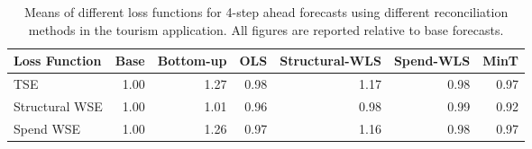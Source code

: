 \begin{table}[ht]
\centering
\begin{tabular}{lrrrrrr}
  \hline
Loss Function & Base & Bottom-up & OLS & Structural-WLS & Spend-WLS & MinT \\ 
  \hline
TSE & 1.00 & 1.27 & 0.98 & 1.17 & 0.98 & 0.97 \\ 
  Structural WSE & 1.00 & 1.01 & 0.96 & 0.98 & 0.99 & 0.92 \\ 
  Spend WSE & 1.00 & 1.26 & 0.97 & 1.16 & 0.98 & 0.97 \\ 
   \hline
\end{tabular}
\caption{Means of different loss functions for 4-step ahead forecasts using different reconciliation methods in the tourism application.  All figures are reported relative to base forecasts.} 
\end{table}

